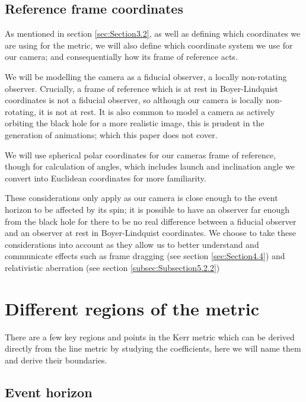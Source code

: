 \documentclass[oneside,openright,frontopenright, singlespacing]{dmathesis}
\begin{document}
\subsection{Reference frame coordinates}\label{subsec:SubSection4.2.1}

	As mentioned in section \ref{sec:Section3.2}, as well as defining which coordinates we are using for the metric, we will also define which coordinate system we use for our camera; and consequentially how its frame of reference acts. 

\vspace{1em}
	We will be modelling the camera as a fiducial observer, a locally non-rotating observer. Crucially, a frame of reference which is at rest in Boyer-Lindquist coordinates is not a fiducial observer, so although our camera is locally non-rotating, it is not at rest. It is also common to model a camera as actively orbiting the black hole for a more realistic image, this is prudent in the generation of animations; which this paper does not cover.

\vspace{1em}
	We will use spherical polar coordinates for our cameras frame of reference, though for calculation of angles, which includes launch and inclination angle we convert into Euclidean coordinates for more familiarity.

\vspace{1em}
	These considerations only apply as our camera is close enough to the event horizon to be affected by its spin; it is possible to have an observer far enough from the black hole for there to be no real difference between a fiducial observer and an observer at rest in Boyer-Lindquist coordinates. We choose to take these considerations into account as they allow us to better understand and communicate effects such as frame dragging (see section \ref{sec:Section4.4}) and relativistic aberration (see section \ref{subsec:Subsection5.2.2})


\section{Different regions of the metric}\label{sec:Section4.3}

	There are a few key regions and points in the Kerr metric which can be derived directly from the line metric by studying the coefficients, here we will name them and derive their boundaries.

\subsection{Event horizon}\label{subsec:SubSection4.3.1}
\end{document}
